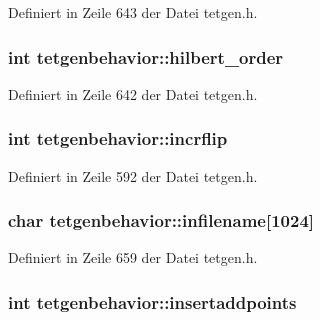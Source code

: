 Definiert in Zeile 643 der Datei tetgen.\-h.

\hypertarget{classtetgenbehavior_a24291eedf8d006b92321d07d466fa19a}{
\subsubsection[{hilbert\-\_\-order}]{\setlength{\rightskip}{0pt plus 5cm}int tetgenbehavior\-::hilbert\-\_\-order}}\label{classtetgenbehavior_a24291eedf8d006b92321d07d466fa19a}


Definiert in Zeile 642 der Datei tetgen.\-h.

\hypertarget{classtetgenbehavior_a340fcbca73520d6cbd33cc5ef113554d}{
\subsubsection[{incrflip}]{\setlength{\rightskip}{0pt plus 5cm}int tetgenbehavior\-::incrflip}}\label{classtetgenbehavior_a340fcbca73520d6cbd33cc5ef113554d}


Definiert in Zeile 592 der Datei tetgen.\-h.

\hypertarget{classtetgenbehavior_ac879f6843038d5428199079c515ce6e6}{
\subsubsection[{infilename}]{\setlength{\rightskip}{0pt plus 5cm}char tetgenbehavior\-::infilename\mbox{[}1024\mbox{]}}}\label{classtetgenbehavior_ac879f6843038d5428199079c515ce6e6}


Definiert in Zeile 659 der Datei tetgen.\-h.

\hypertarget{classtetgenbehavior_a663e7008fca88d61ff34f01716c98da8}{
\subsubsection[{insertaddpoints}]{\setlength{\rightskip}{0pt plus 5cm}int tetgenbehavior\-::insertaddpoints}}\label{classtetgenbehavior_a663e7008fca88d61ff34f01716c98da8}


